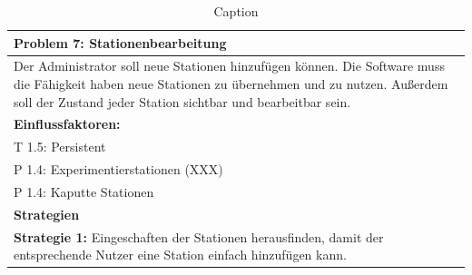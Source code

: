 \documentclass[enabledeprecatedfontcommands,fontsize=12pt,paper=a4,twoside]{scrartcl}
\begin{document}


\begin{table}[]

    \centering
    \begin{tabular}{|p{15cm}|}
    \hline
          \textbf{Problem 7:} Stationenbearbeitung
          \\ \hline
          Der Administrator soll neue Stationen hinzufügen können. Die Software muss die Fähigkeit haben neue Stationen zu übernehmen und zu nutzen. Außerdem soll der Zustand jeder Station sichtbar und bearbeitbar sein.
          \\ \hline
          \textbf{Einflussfaktoren: } \\
          T 1.5: Persistent \\
          P 1.4: Experimentierstationen (XXX)\\
          P 1.4: Kaputte Stationen\\
          \hline
          \textbf{Strategien} \\ \hline
          \textbf{Strategie 1:} Eingeschaften der Stationen herausfinden, damit der entsprechende Nutzer eine Station einfach hinzufügen kann.
          \\ \hline
    \end{tabular}
    \caption{Caption}
    \label{tab:my_label}
\end{table}
\end{document}
